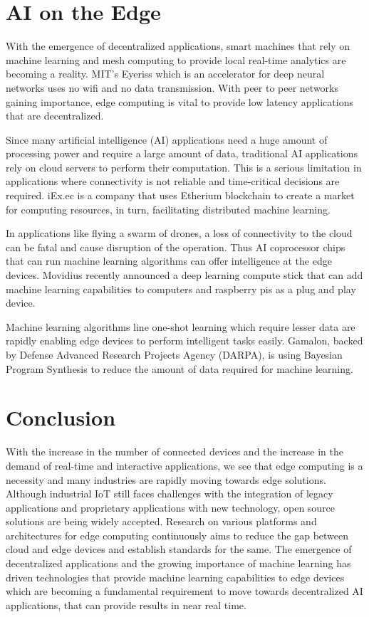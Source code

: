 \documentclass[sigconf]{acmart}
\begin{document}
\section{AI on the Edge}
With the emergence of decentralized applications, smart machines that rely on machine learning and mesh computing to provide local real-time analytics are becoming a reality. MIT's Eyeriss which is an accelerator for deep neural networks uses no wifi and no data transmission. With peer to peer networks gaining importance, edge computing is vital to provide low latency applications that are decentralized\cite{ibm_iot_edge}.

Since many artificial intelligence (AI) applications need a huge amount of processing power and require a large amount of data, traditional AI applications rely on cloud servers to perform their computation. This is a serious limitation in applications where connectivity is not reliable and time-critical decisions are required\cite{ai-to-edge}. iEx.ec is a company that uses Etherium blockchain to create a market for computing resources, in turn, facilitating distributed machine learning\cite{iExec}.

In applications like flying a swarm of drones, a loss of connectivity to the cloud can be fatal and cause disruption of the operation. Thus AI coprocessor chips that can run machine learning algorithms can offer intelligence at the edge devices. Movidius recently announced a deep learning compute stick\cite{movidius} that can add machine learning capabilities to computers and raspberry pis as a plug and play device\cite{ai-to-edge}.

Machine learning algorithms line one-shot learning which require lesser data are rapidly enabling edge devices to perform intelligent tasks easily\cite{wiki-one-shot-learning}.
Gamalon, backed by Defense Advanced Research Projects Agency (DARPA), is using Bayesian Program Synthesis to reduce the amount of data required for machine learning\cite{ai-to-edge}. 

\section{Conclusion}
With the increase in the number of connected devices and the increase in the demand of real-time and interactive applications, we see that edge computing is a necessity and many industries are rapidly moving towards edge solutions. Although industrial IoT still faces challenges with the integration of legacy applications and proprietary applications with new technology, open source solutions are being widely accepted. Research on various platforms and architectures for edge computing continuously aims to reduce the gap between cloud and edge devices and establish standards for the same. The emergence of decentralized applications and the growing importance of machine learning has driven technologies that provide machine learning capabilities to edge devices which are becoming a fundamental requirement to move towards decentralized AI applications, that can provide results in near real time.
\end{document}
